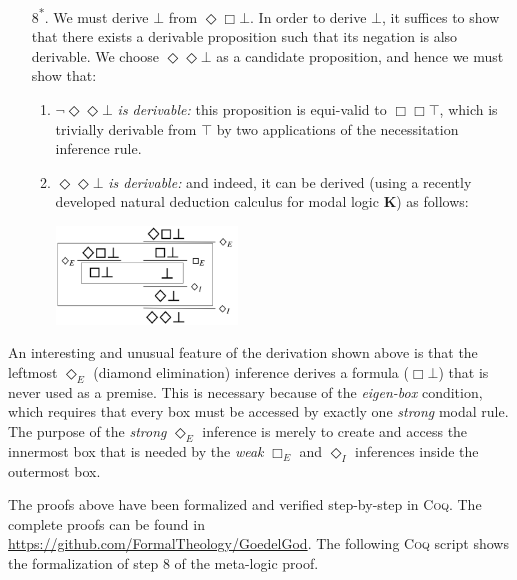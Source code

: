 \documentclass{llncs}
\newcommand{\logic}[1]{\textbf{#1}\xspace}
\newcommand{\K}{\logic{K}}
\newcommand{\Dia}{\Diamond} %
\newcommand{\nec}{\Box}
\newcommand{\pos}{\Dia}
\begin{document}
\begin{enumerate}
\item[8\textsuperscript{*}.] We must derive $\bot$ from $\pos \nec \bot$. In order to derive $\bot$, it suffices to show that there exists a derivable proposition such that its negation is also derivable. We choose $\pos \pos \bot$ as a candidate proposition, and hence we must show that:
\begin{enumerate}
\item $\neg \pos \pos \bot$ \emph{is derivable:} this proposition is equi-valid to $\nec \nec \top$, which is trivially derivable from $\top$ by two applications of the necessitation inference rule.

\item $\pos \pos \bot$ \emph{is derivable:} and indeed, it can be
  derived (using a recently developed natural deduction calculus for
  modal logic \K \cite{CSR}) as follows: \\

\begin{center}
\includegraphics[width=0.4\textwidth]{Derivation}
\end{center}

\end{enumerate}

\end{enumerate}

An interesting and unusual feature of the derivation shown above is that the leftmost $\pos_E$ (diamond elimination) inference derives a formula ($\nec \bot$) that is never used as a premise. This is necessary because of the \emph{eigen-box} condition, which requires that every box must be accessed by exactly one \emph{strong} modal rule. The purpose of the \emph{strong} $\pos_E$ inference is merely to create and access the innermost box that is needed by the \emph{weak} $\nec_E$ and $\pos_I$ inferences inside the outermost box.

The proofs above have been formalized and verified step-by-step in \textsc{Coq}. The complete proofs can be found in \url{https://github.com/FormalTheology/GoedelGod}. The following \textsc{Coq} script shows the formalization of step 8 of the meta-logic proof.
\end{document}
